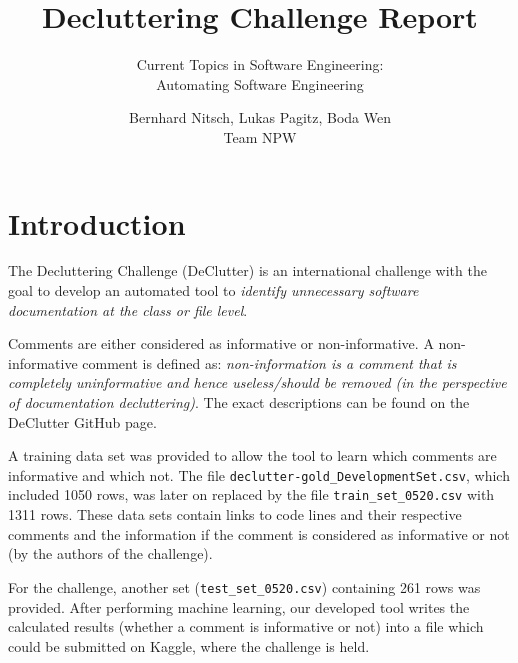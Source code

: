 \documentclass[runningheads]{llncs}
\begin{document}
\sloppy
%
\title{Decluttering Challenge Report}
\subtitle{Current Topics in Software Engineering:\\
Automating Software Engineering}
%
%
\author{Bernhard Nitsch, Lukas Pagitz, Boda Wen\\
Team NPW}
%
\authorrunning{ }
%
%
\maketitle
%
%


\section{Introduction}
The Decluttering Challenge (DeClutter) is an international challenge with the goal to develop an automated tool to \textit{identify unnecessary software documentation at the class or file level}. \cite{ref_declutter}

Comments are either considered as informative or non-informative. A non-informative comment is defined as: \textit{non-information is a comment that is completely uninformative and hence useless/should be removed (in the perspective of documentation decluttering)}.
The exact descriptions can be found on the DeClutter GitHub page.

A training data set was provided to allow the tool to learn which comments are informative and which not. The file \texttt{declutter-gold\_DevelopmentSet.csv}, which included 1050 rows, was later on replaced by the file \texttt{train\_set\_0520.csv} with 1311 rows. 
These data sets contain links to code lines and their respective comments and the information if the comment is considered as informative or not (by the authors of the challenge).

For the challenge, another set (\texttt{test\_set\_0520.csv}) containing 261 rows was provided. After performing machine learning, our developed tool writes the calculated results (whether a comment is informative or not) into a file which could be submitted on Kaggle, where the challenge is held. \cite{ref_kaggle}
\end{document}
